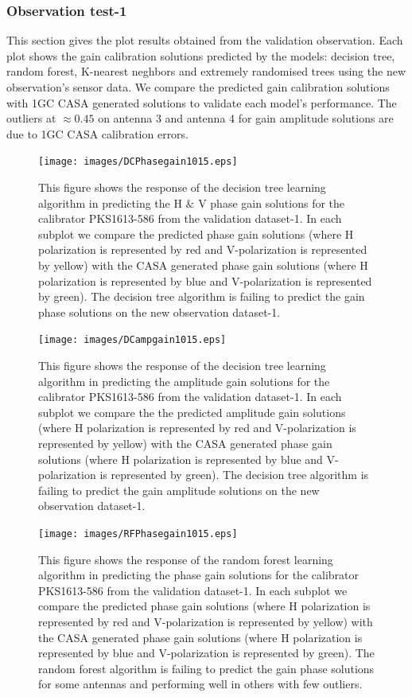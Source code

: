\subsubsection{Observation test-1}
This section gives the plot results obtained from the validation observation.  Each plot shows the gain calibration solutions predicted by the models: decision tree, random forest, K-nearest neghbors and extremely randomised trees using the new observation's sensor data. We compare the predicted gain calibration solutions with 1GC CASA generated solutions to validate each model's performance. The outliers at $\approx 0.45$ on antenna 3 and antenna 4 for gain amplitude solutions are due to 1GC CASA calibration errors.   

\begin{figure}[H]
    \texttt{[image: images/DCPhasegain1015.eps]}
    \caption{This figure shows the response of the decision tree learning algorithm in predicting the H $\&$ V phase gain solutions for the calibrator PKS1613-586 from the validation dataset-1. In each subplot we compare the predicted phase gain solutions (where H polarization is represented by red and V-polarization is represented by yellow) with the CASA generated phase gain solutions (where H polarization is represented by blue and V-polarization is represented by green). The decision tree algorithm is failing to predict the gain phase solutions on the new observation dataset-1.}
    \label{obs5}
\end{figure}

\begin{figure}[H]
    \texttt{[image: images/DCampgain1015.eps]}
    \caption{This figure shows the response of the decision tree learning algorithm in predicting the amplitude gain solutions for the calibrator PKS1613-586 from the validation dataset-1. In each subplot we compare the the predicted amplitude gain solutions (where H polarization is represented by red and V-polarization is represented by yellow) with the CASA generated phase gain solutions (where H polarization is represented by blue and V-polarization is represented by green). The decision tree algorithm is failing to predict the gain amplitude solutions on the new observation dataset-1.}
     \label{da2}
\end{figure}


\begin{figure}[H]
    \texttt{[image: images/RFPhasegain1015.eps]}
    \caption{This figure shows the response of the random forest learning algorithm in predicting the phase gain solutions for the calibrator PKS1613-586 from the validation dataset-1. In each subplot we compare the predicted phase gain solutions (where H polarization is represented by red and V-polarization is represented by yellow) with the CASA generated phase gain solutions (where H polarization is represented by blue and V-polarization is represented by green). The random forest algorithm is failing to predict the gain phase solutions for some antennas and performing well in others with few outliers.}
    \label{obs6}
\end{figure}

